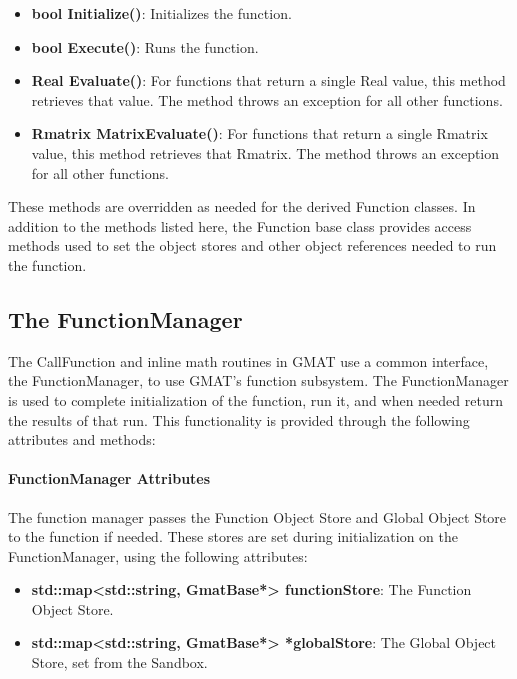 \begin{itemize}
\item \textbf{bool Initialize()}: Initializes the function.
\item \textbf{bool Execute()}: Runs the function.
\item \textbf{Real Evaluate()}: For functions that return a single Real value, this method
retrieves that value.  The method throws an exception for all other functions.
\item \textbf{Rmatrix MatrixEvaluate()}: For functions that return a single Rmatrix value, this
method retrieves that Rmatrix.  The method throws an exception for all other functions.
\end{itemize}

\noindent These methods are overridden as needed for the derived Function classes.  In addition to
the methods listed here, the Function base class provides access methods used to set the object
stores and other object references needed to run the function.

\subsection{The FunctionManager}

The CallFunction and inline math routines in GMAT use a common interface, the FunctionManager, to
use GMAT's function subsystem.  The FunctionManager is used to complete initialization of the
function, run it, and when needed return the results of that run.  This functionality is provided
through the following attributes and methods:

\paragraph{FunctionManager Attributes}

The function manager passes the Function Object Store and Global Object Store to the function if
needed.  These stores are set during initialization on the FunctionManager, using the following
attributes:

\begin{itemize}
\item \textbf{std::map<std::string, GmatBase*> functionStore}: The Function Object Store.
\item \textbf{std::map<std::string, GmatBase*> *globalStore}: The Global Object Store, set from the
Sandbox.
\end{itemize}


